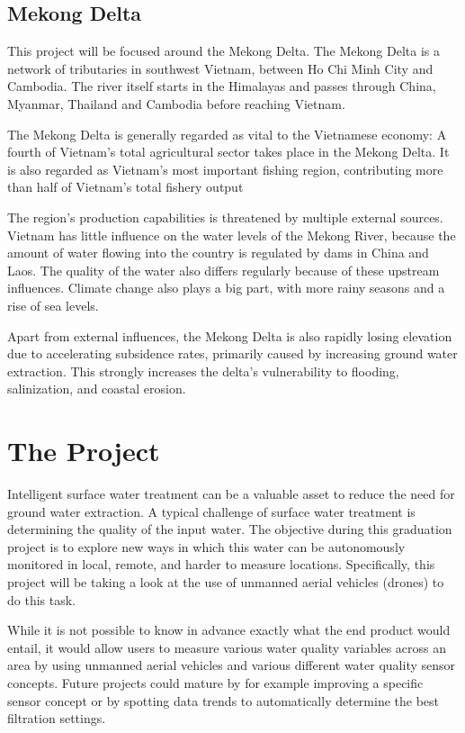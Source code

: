 \documentclass[11pt, a4paper]{article}
\begin{document}
\subsection{Mekong Delta}
This project will be focused around the Mekong Delta. The Mekong Delta is a network of tributaries in southwest Vietnam, between Ho Chi Minh City and Cambodia. The river itself starts in the Himalayas and passes through China, Myanmar, Thailand and Cambodia before reaching Vietnam.

The Mekong Delta is generally regarded as vital to the Vietnamese economy: A fourth of Vietnam's total agricultural sector takes place in the Mekong Delta. It is also regarded as Vietnam's most important fishing region, contributing more than half of Vietnam's total fishery output \cite{vietstats}

The region's production capabilities is threatened by multiple external sources. Vietnam has little influence on the water levels of the Mekong River, because the amount of water flowing into the country is regulated by dams in China and Laos. The quality of the water also differs regularly because of these upstream influences. Climate change also plays a big part, with more rainy seasons and a rise of sea levels. \cite{wur}

Apart from external influences, the Mekong Delta is also rapidly losing elevation due to accelerating subsidence rates, primarily caused by increasing ground water extraction. This strongly increases the delta’s vulnerability to flooding, salinization, and coastal erosion. \cite{minderhoud2020}
\pagebreak
\section{The Project}
Intelligent surface water treatment can be a valuable asset to reduce the need for ground water extraction. A typical challenge of surface water treatment is determining the quality of the input water. The objective during this graduation project is to explore new ways in which this water can be autonomously monitored in local, remote, and harder to measure locations. Specifically, this project will be taking a look at the use of unmanned aerial vehicles (drones) to do this task. 

While it is not possible to know in advance exactly what the end product would entail, it would allow users to measure various water quality variables across an area by using unmanned aerial vehicles and various different water quality sensor concepts. Future projects could mature by for example improving a specific sensor concept or by spotting data trends to automatically determine the best filtration settings.
\end{document}
